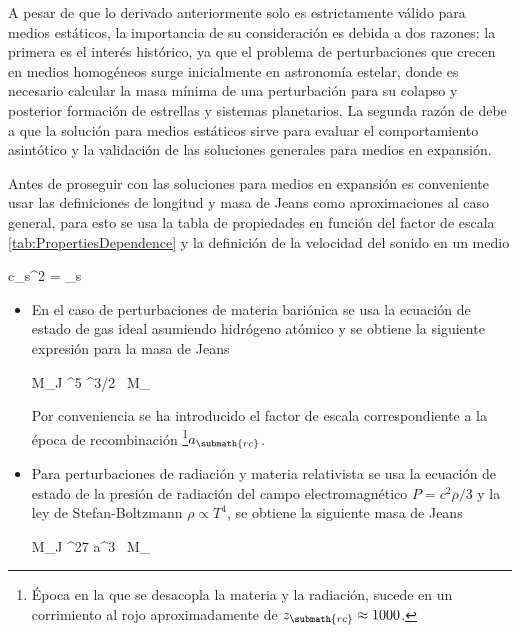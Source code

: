 A pesar de que lo derivado anteriormente solo es estrictamente válido para 
medios estáticos, la importancia de su consideración es debida a dos 
razones: la primera es el interés histórico, ya que el problema de 
perturbaciones que crecen en medios homogéneos surge inicialmente en 
astronomía estelar, donde es necesario calcular la masa mínima de una 
perturbación para su colapso y posterior formación de estrellas y sistemas 
planetarios. La segunda razón de debe a que la solución para medios 
estáticos sirve para evaluar el comportamiento asintótico y la validación 
de las soluciones generales para medios en expansión.


Antes de proseguir con las soluciones para medios en expansión es 
conveniente usar las definiciones de longitud y masa de Jeans como 
aproximaciones al caso general, para esto se usa la tabla de propiedades en
función del factor de escala \ref{tab:PropertiesDependence} y la definición 
de la velocidad del sonido en un medio \cite{pathria1996}
	

{ c_s^2 = _s }


\begin{itemize}
\item En el caso de perturbaciones de materia bariónica se usa la ecuación 
de estado de gas ideal asumiendo hidrógeno atómico y se obtiene la
siguiente expresión para la masa de Jeans


{ M_{J} ^5
^{3/2} \mbox{ M}_{\odot}}


Por conveniencia se ha introducido el factor de escala correspondiente a la 
época de recombinación \footnote{Época en la que se desacopla la
materia y la radiación, sucede en un corrimiento al rojo aproximadamente de
$z_{\submath{rc}}\approx 1000$.}$a_{\submath{rc}}$.


\item Para perturbaciones de radiación y materia relativista se usa la 
ecuación de estado de la presión de radiación del campo electromagnético 
\cite{jackson1999} $P = c^2\rho/3$ y la ley de Stefan-Boltzmann
$\rho \propto T^4$, se obtiene la siguiente masa de Jeans


{ M_{J}   ^{27} a^3 \mbox{ M}_{\odot}}
\end{itemize}

